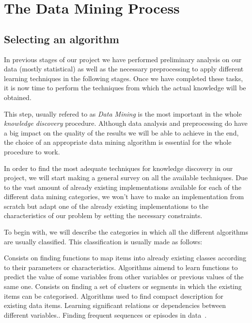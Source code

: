 \chapter{The Data Mining Process}

\section{Selecting an algorithm}
\label{sec:datamining}
In previous stages of our project we have performed preliminary analysis on our data (mostly statistical) as well as the necessary preprocessing to apply different learning techniques in the following stages. Once we have completed these tasks, it is now time to perform the techniques from which the actual knowledge will be obtained.

This step, usually refered to as \emph{Data Mining} is the most important in the whole \emph{knowledge discovery} procedure. Although data analysis and preprocessing do have a big impact on the quality of the results we will be able to achieve in the end, the choice of an appropriate data mining algorithm is essential for the whole procedure to work.

In order to find the most adequate techniques for knowledge discovery in our project, we will start making a general survey on all the available techniques. Due to the vast amount of already existing implementations available for each of the different data mining categories, we won't have to make an implementation from scratch but adapt one of the already existing implementations to the characteristics of our problem by setting the necessary constraints.

To begin with, we will describe the categories in which all the different algorithms are usually classified. This classification is usually made as follows:

\begin{enumerate}
  Consists on finding functions to map items into already existing classes according to their parameters or characteristics.
  Algorithms aimend to learn functions to predict the value of some variables from other variables or previous values of the same one.
  Consists on finding a set of clusters or segments in which the existing items can be categorised.
  Algorithms used to find compact description for existing data items.
  Learning significant relations or dependencies between different variables.\cite{Zhao2003association}.
  Finding frequent sequences or episodes in data~\cite{zhao2003sequential,weiss2002predicting}.
\end{enumerate}

